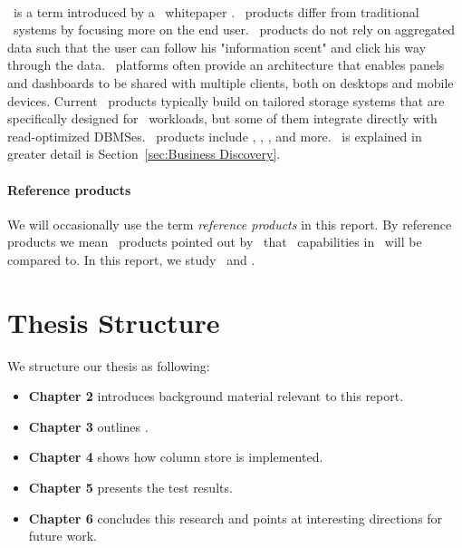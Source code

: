 \paragraph{\bd}
\label{par:Business Discovery}
\bd~is a term introduced by a \qlikview~whitepaper \cite{Qlik2014-vd}. \bd~products differ from traditional \bi~systems by focusing more on the end user. \bd~products do not rely on aggregated data such that the user can follow his "information scent" and click his way through the data. \bd~platforms often provide an architecture that enables panels and dashboards to be shared with multiple clients, both on desktops and mobile devices. Current \bd~products typically build on tailored storage systems that are specifically designed for \bd~workloads, but some of them integrate directly with read-optimized DBMSes. \bd~products include \tableau, \qlikview, \powerpivot, and more. \bd~is explained in greater detail is Section~\ref{sec:Business Discovery}.

\paragraph{Reference products}
\label{par:Reference products}
We will occasionally use the term \textit{reference products} in this report. By reference products we mean \bd~products pointed out by \genus~that \bd~capabilities in \gap~will be compared to. In this report, we study \qlikview~and \tableau.


\section{Thesis Structure}
\label{sec:Thesis Structure}
We structure our thesis as following:
\begin{itemize}
  \item \textbf{Chapter 2} introduces background material relevant to this report. 
  \item \textbf{Chapter 3} outlines \gap.
  \item \textbf{Chapter 4} shows how column store is implemented.
  \item \textbf{Chapter 5} presents the test results.
  \item \textbf{Chapter 6} concludes this research and points at interesting directions for future work.
\end{itemize}



